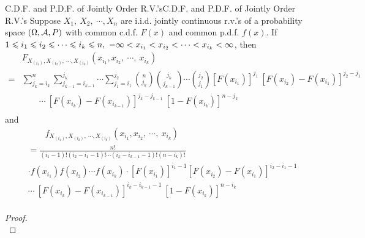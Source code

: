 \documentclass{elegantbook}
\begin{document}
\begin{theorem}{C.D.F. and P.D.F. of Jointly Order R.V.'s}{C.D.F. and P.D.F. of Jointly Order R.V.'s}
Suppose \(X_{1},\ X_{2},\ \cdots,X_{n}\) are i.i.d. jointly continuous r.v.'s of a probability space $(\Omega,\mathcal{A}, P)$ with common c.d.f. \(F(x)\) and common p.d.f. \(f(x)\). If
\(1 \leqslant i_{1} \leqslant i_{2} \leqslant \cdots \leqslant i_{k} \leqslant n,\  - \infty < x_{i_{1}} < x_{i_{2}} < \cdots < x_{i_{k}} < \infty\), then
\[\begin{aligned}
&F_{X_{\left(i_{1}\right)},X_{\left(i_{2}\right)},\ \cdots,X_{\left(i_{k}\right)}}\left( x_{i_{1}},x_{i_{2}},\ \cdots,\ x_{i_{k}} \right)\\
=& \sum_{j_{k} = i_{k}}^{n}{\sum_{j_{k - 1} = i_{k - 1}}^{j_{k}}\cdots}\sum_{j_{1} = i_{1}}^{j_{2}} \binom{n}{j_{k}}\binom{j_{k}}{j_{k - 1}} \cdots \binom{j_{2}}{j_{1}}\left\lbrack F\left( x_{i_{1}} \right) \right\rbrack^{j_{1}}\ \left\lbrack F\left( x_{i_{2}} \right) - F\left( x_{i_{1}} \right) \right\rbrack^{j_{2} - j_{1}}\\
&\qquad\cdots\ \left\lbrack F\left( x_{i_{k}} \right) - F\left( x_{i_{k - 1}} \right) \right\rbrack^{j_{k} - j_{k - 1}}\ \left\lbrack 1 - F\left( x_{i_{k}} \right) \right\rbrack^{n - j_{k}}\\
\end{aligned}\]
and
\[\begin{aligned}
&\qquad f_{X_{\left(i_{1}\right)},X_{\left(i_{2}\right)},\ \cdots,X_{\left(i_{k}\right)}}\left( x_{i_{1}},x_{i_{2}},\ \cdots,\ x_{i_{k}} \right)\\
&= \frac{n!}{\left( i_{1} - 1 \right)!\left( i_{2} - i_{1} - 1 \right)!\cdots\left( i_{k} - i_{k - 1} - 1 \right)!\left( n - i_{k} \right)!}\\
&\cdot f\left( x_{i_{1}} \right)f\left( x_{i_{2}} \right)\cdots f\left( x_{i_{k}} \right)\cdot \left\lbrack F\left( x_{i_{1}} \right) \right\rbrack^{i_{1} - 1}\left\lbrack F\left( x_{i_{2}} \right) - F\left( x_{i_{1}} \right) \right\rbrack^{i_{2} - i_{1} - 1}\\
&\cdots\ \left\lbrack F\left( x_{i_{k}} \right) - F\left( x_{i_{k - 1}} \right) \right\rbrack^{i_{k} - i_{k - 1} - 1}\ \left\lbrack 1 - F\left( x_{i_{k}} \right) \right\rbrack^{n - i_{k}}\\
\end{aligned}\]
\vspace{0.01cm}
\end{theorem}

\begin{proof}
\\[4cm]\vspace{0.01cm}
\end{proof}
\end{document}
